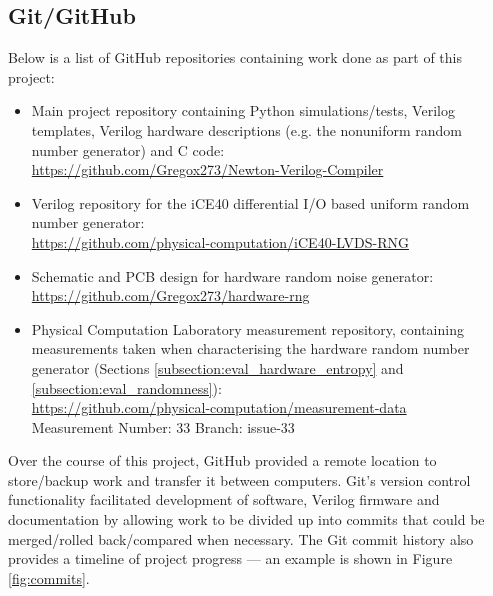 \documentclass[12pt]{article}
\begin{document}
  \subsection{Git/GitHub} \label{subsection:GitHub}
    Below is a list of GitHub repositories containing work done as part of this project:
    \begin{itemize}
        \item Main project repository containing Python simulations/tests, Verilog templates, Verilog hardware descriptions (e.g. the nonuniform random number generator) and C code:\\
        \url{https://github.com/Gregox273/Newton-Verilog-Compiler}
        \item Verilog repository for the iCE40 differential I/O based uniform random number generator:\\
        \url{https://github.com/physical-computation/iCE40-LVDS-RNG}
        \item Schematic and PCB design for hardware random noise generator:\\
        \url{https://github.com/Gregox273/hardware-rng}
        \item Physical Computation Laboratory measurement repository, containing measurements taken when characterising the hardware random number generator (Sections \ref{subsection:eval_hardware_entropy} and \ref{subsection:eval_randomness}):\\
        \url{https://github.com/physical-computation/measurement-data}\\
        Measurement Number: 33
        Branch: issue-33

    \end{itemize}

    Over the course of this project, GitHub provided a remote location to store/backup work and transfer it between computers. Git's version control functionality facilitated development of software, Verilog firmware and documentation by allowing work to be divided up into commits that could be merged/rolled back/compared when necessary. The Git commit history also provides a timeline of project progress --- an example is shown in Figure \ref{fig:commits}.
\end{document}
